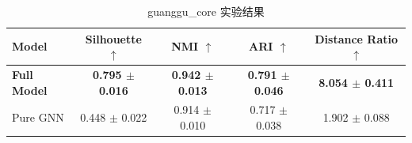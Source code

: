 \begin{table}[htbp]
  \centering
  \caption{guanggu_core 实验结果}
  \label{tab:guanggu_core_results}
  \begin{tabular}{lcccc}
    \toprule
    Model & Silhouette $\uparrow$ & NMI $\uparrow$ & ARI $\uparrow$ & Distance Ratio $\uparrow$ \\
    \midrule
    \textbf{Full Model} & \textbf{0.795 $\pm$ 0.016} & \textbf{0.942 $\pm$ 0.013} & \textbf{0.791 $\pm$ 0.046} & \textbf{8.054 $\pm$ 0.411} \\
    Pure GNN & 0.448 $\pm$ 0.022 & 0.914 $\pm$ 0.010 & 0.717 $\pm$ 0.038 & 1.902 $\pm$ 0.088 \\
    \bottomrule
  \end{tabular}
\end{table}